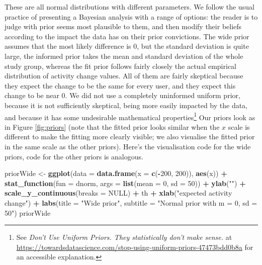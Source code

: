 \documentclass[10pt,]{scrartcl}
\newenvironment{Shaded}{\begin{snugshade}}{\end{snugshade}}
\newcommand{\KeywordTok}[1]{\textcolor[rgb]{0.13,0.29,0.53}{\textbf{#1}}}
\newcommand{\DataTypeTok}[1]{\textcolor[rgb]{0.13,0.29,0.53}{#1}}
\newcommand{\DecValTok}[1]{\textcolor[rgb]{0.00,0.00,0.81}{#1}}
\newcommand{\StringTok}[1]{\textcolor[rgb]{0.31,0.60,0.02}{#1}}
\newcommand{\OtherTok}[1]{\textcolor[rgb]{0.56,0.35,0.01}{#1}}
\newcommand{\OperatorTok}[1]{\textcolor[rgb]{0.81,0.36,0.00}{\textbf{#1}}}
\newcommand{\NormalTok}[1]{#1}
\begin{document}
\normalsize

These are all normal distributions with different parameters. We follow
the usual practice of presenting a Bayesian analysis with a range of
options: the reader is to judge with prior seems most plausible to them,
and then modify their beliefs according to the impact the data has on
their prior convictions. The wide prior assumes that the most likely
difference is 0, but the standard deviation is quite large, the informed
prior takes the mean and standard deviation of the whole study group,
whereas the fit prior follows fairly closely the actual empirical
distribution of activity change values. All of them are fairly skeptical
because they expect the change to be the same for every user, and they
expect this change to be near 0. We did not use a completely uninformed
uniform prior, because it is not sufficiently skeptical, being more
easily impacted by the data, and because it has some undesirable
mathematical
properties\footnote{See \emph{Don’t Use Uniform Priors. They statistically don’t make sense.} at \url{https://towardsdatascience.com/stop-using-uniform-priors-47473bdd0b8a} for an accessible explanation.}
Our priors look as in Figure \ref{fig:priors} (note that the fitted
prior looks similar when the \(x\) scale is different to make the
fitting more clearly visible; we also visualise the fitted prior in the
same scale as the other priors). Here's the visualisation code for the
wide priors, code for the other priors is analogous.

\footnotesize

\begin{Shaded}
\begin{Highlighting}[]
\NormalTok{priorWide <-}\StringTok{ }\KeywordTok{ggplot}\NormalTok{(}\DataTypeTok{data =} \KeywordTok{data.frame}\NormalTok{(}\DataTypeTok{x =} \KeywordTok{c}\NormalTok{(}\OperatorTok{-}\DecValTok{200}\NormalTok{, }\DecValTok{200}\NormalTok{)), }\KeywordTok{aes}\NormalTok{(x)) }\OperatorTok{+}
\StringTok{    }\KeywordTok{stat_function}\NormalTok{(}\DataTypeTok{fun =}\NormalTok{ dnorm, }\DataTypeTok{args =} \KeywordTok{list}\NormalTok{(}\DataTypeTok{mean =} \DecValTok{0}\NormalTok{, }\DataTypeTok{sd =} \DecValTok{50}\NormalTok{)) }\OperatorTok{+}
\StringTok{    }\KeywordTok{ylab}\NormalTok{(}\StringTok{""}\NormalTok{) }\OperatorTok{+}\StringTok{ }\KeywordTok{scale_y_continuous}\NormalTok{(}\DataTypeTok{breaks =} \OtherTok{NULL}\NormalTok{) }\OperatorTok{+}\StringTok{ }\NormalTok{th }\OperatorTok{+}\StringTok{ }\KeywordTok{xlab}\NormalTok{(}\StringTok{"expected activity change"}\NormalTok{) }\OperatorTok{+}
\StringTok{    }\KeywordTok{labs}\NormalTok{(}\DataTypeTok{title =} \StringTok{"Wide prior"}\NormalTok{, }\DataTypeTok{subtitle =} \StringTok{"Normal prior with m = 0, sd = 50"}\NormalTok{)}
\NormalTok{priorWide}
\end{Highlighting}
\end{Shaded}
\end{document}
